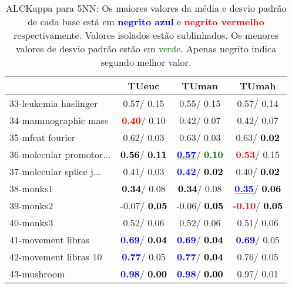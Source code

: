 \begin{table}[h]
\caption{ALCKappa para 5NN: Os maiores valores da média e desvio padrão de cada base está em \textcolor{blue}{\textbf{negrito azul}} e \textcolor{red}{\textbf{negrito vermelho}} respectivamente. Valores isolados estão sublinhados. Os menores valores de desvio padrão estão em \textcolor{darkgreen}{verde}. Apenas negrito indica segundo melhor valor.}
\begin{center}\begin{tabular}{lc|c|c}
 & TUeuc & TUman & TUmah\\ \hline 33-leukemia haslinger &   0.57/  0.15 &   0.55/  0.15 &   0.57/  0.14 \\
34-mammographic mass & \textcolor{red}{\textbf{  0.40}}/  0.10 &   0.42/  0.07 &   0.42/  0.07 \\
35-mfeat fourier &   0.62/  0.03 &   0.63/  0.03 &   0.63/\textcolor{black}{\textbf{  0.02}} \\
36-molecular promotor... & \textcolor{black}{\textbf{  0.56}}/\textcolor{black}{\textbf{  0.11}} & \underline{\textcolor{blue}{\textbf{  0.57}}}/\textcolor{darkgreen}{\textbf{  0.10}} & \textcolor{red}{\textbf{  0.53}}/  0.15 \\
37-molecular splice j... &   0.41/  0.03 & \textcolor{blue}{\textbf{  0.42}}/\textcolor{black}{\textbf{  0.02}} &   0.40/\textcolor{black}{\textbf{  0.02}} \\
38-monks1 & \textcolor{black}{\textbf{  0.34}}/  0.08 & \textcolor{black}{\textbf{  0.34}}/  0.08 & \underline{\textcolor{blue}{\textbf{  0.35}}}/\textcolor{black}{\textbf{  0.06}} \\
39-monks2 &  -0.07/\textcolor{black}{\textbf{  0.05}} &  -0.06/\textcolor{black}{\textbf{  0.05}} & \textcolor{red}{\textbf{ -0.10}}/\textcolor{black}{\textbf{  0.05}} \\ \hline
40-monks3 &   0.52/  0.06 &   0.52/  0.06 &   0.51/  0.06 \\
41-movement libras & \textcolor{blue}{\textbf{  0.69}}/\textcolor{black}{\textbf{  0.04}} & \textcolor{blue}{\textbf{  0.69}}/\textcolor{black}{\textbf{  0.04}} & \textcolor{blue}{\textbf{  0.69}}/  0.05 \\
42-movement libras 10 & \textcolor{blue}{\textbf{  0.77}}/  0.05 & \textcolor{blue}{\textbf{  0.77}}/\textcolor{black}{\textbf{  0.04}} &   0.76/  0.05 \\
43-mushroom & \textcolor{blue}{\textbf{  0.98}}/\textcolor{black}{\textbf{  0.00}} & \textcolor{blue}{\textbf{  0.98}}/\textcolor{black}{\textbf{  0.00}} &   0.97/  0.01 \\

\end{tabular}
\end{center}
\end{table}
